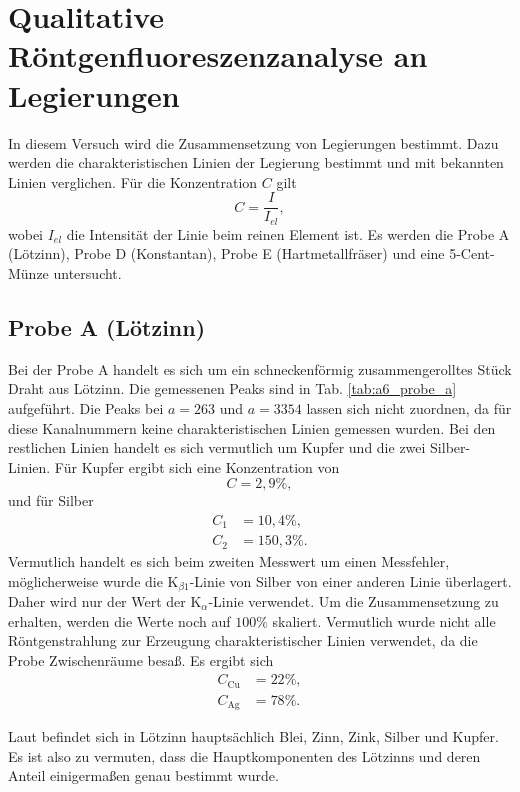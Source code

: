 \section{Qualitative Röntgenfluoreszenzanalyse an Legierungen}

In diesem Versuch wird die Zusammensetzung von Legierungen bestimmt. Dazu werden die charakteristischen Linien der Legierung bestimmt und mit bekannten Linien verglichen. Für die Konzentration $C$ gilt
\begin{equation}
 C = \frac{I}{I_{el}},
\end{equation}
wobei $I_{el}$ die Intensität der Linie beim reinen Element ist. Es werden die Probe A (Lötzinn), Probe D (Konstantan), Probe E (Hartmetallfräser) und eine 5-Cent-Münze untersucht.

\subsection{Probe A (Lötzinn)}

Bei der Probe A handelt es sich um ein schneckenförmig zusammengerolltes Stück Draht aus Lötzinn. Die gemessenen Peaks sind in Tab. \ref{tab:a6_probe_a} aufgeführt. Die Peaks bei $a=263$ und $a=3354$ lassen sich nicht zuordnen, da für diese Kanalnummern keine charakteristischen Linien gemessen wurden.
Bei den restlichen Linien handelt es sich vermutlich um Kupfer und die zwei Silber-Linien. Für Kupfer ergibt sich eine Konzentration von
\begin{equation}
 C = 2,9\%,
\end{equation}
und für Silber
\begin{align}
 C_{1} &= 10,4\%, \\
 C_{2} &= 150,3\%.
\end{align}
Vermutlich handelt es sich beim zweiten Messwert um einen Messfehler, möglicherweise wurde die K$_{\beta1}$-Linie von Silber von einer anderen Linie überlagert. Daher wird nur der Wert der K$_{\alpha}$-Linie verwendet.
Um die Zusammensetzung zu erhalten, werden die Werte noch auf $100\%$ skaliert. Vermutlich wurde nicht alle Röntgenstrahlung zur Erzeugung charakteristischer Linien verwendet, da die Probe Zwischenräume besaß.
Es ergibt sich
\begin{align}
 C_{\textrm{Cu}} &= 22\%, \\
 C_{\textrm{Ag}} &= 78\%.
\end{align}

Laut \cite{wiki_lot} befindet sich in Lötzinn hauptsächlich Blei, Zinn, Zink, Silber und Kupfer. Es ist also zu vermuten, dass die Hauptkomponenten des Lötzinns und deren Anteil einigermaßen genau bestimmt wurde.

